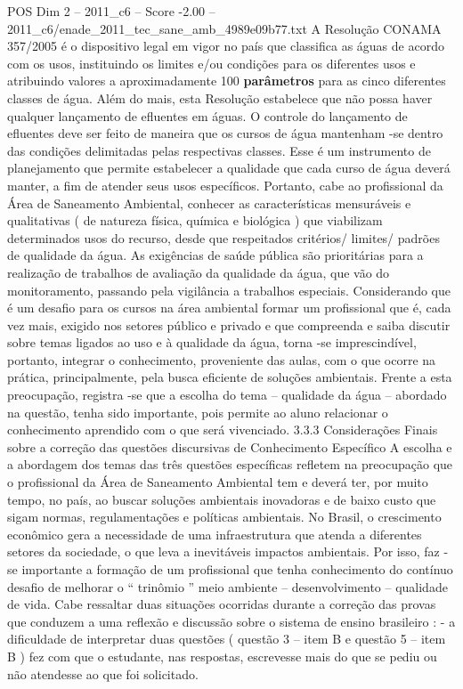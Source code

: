 \begin{textsample}{POS Dim 2 – 2011\_c6 – Score -2.00 – 2011\_c6/enade\_2011\_tec\_sane\_amb\_4989e09b77.txt}
A Resolução CONAMA 357/2005 é o dispositivo legal em vigor no país que classifica as águas de acordo com os usos, instituindo os limites e/ou condições para os diferentes usos e atribuindo valores a aproximadamente 100 \textbf{parâmetros} para as cinco diferentes classes de água.
Além do mais, esta Resolução estabelece que não possa haver qualquer lançamento de efluentes em águas.
O controle do lançamento de efluentes deve ser feito de maneira que os cursos de água mantenham -se dentro das condições delimitadas pelas respectivas classes.
Esse é um instrumento de planejamento que permite estabelecer a qualidade que cada curso de água deverá manter, a fim de atender seus usos específicos.
Portanto, cabe ao profissional da Área de Saneamento Ambiental, conhecer as características mensuráveis e qualitativas ( de natureza física, química e biológica ) que viabilizam determinados usos do recurso, desde que respeitados critérios/ limites/ padrões de qualidade da água.
As exigências de saúde pública são prioritárias para a realização de trabalhos de avaliação da qualidade da água, que vão do monitoramento, passando pela vigilância a trabalhos especiais.
Considerando que é um desafio para os cursos na área ambiental formar um profissional que é, cada vez mais, exigido nos setores público e privado e que compreenda e saiba discutir sobre temas ligados ao uso e à qualidade da água, torna -se imprescindível, portanto, integrar o conhecimento, proveniente das aulas, com o que ocorre na prática, principalmente, pela busca eficiente de soluções ambientais.
Frente a esta preocupação, registra -se que a escolha do tema – qualidade da água – abordado na questão, tenha sido importante, pois permite ao aluno relacionar o conhecimento aprendido com o que será vivenciado. 3.3.3 Considerações Finais sobre a correção das questões discursivas de Conhecimento Específico A escolha e a abordagem dos temas das três questões específicas refletem na preocupação que o profissional da Área de Saneamento Ambiental tem e deverá ter, por muito tempo, no país, ao buscar soluções ambientais inovadoras e de baixo custo que sigam normas, regulamentações e políticas ambientais.
No Brasil, o crescimento econômico gera a necessidade de uma infraestrutura que atenda a diferentes setores da sociedade, o que leva a inevitáveis impactos ambientais.
Por isso, faz -se importante a formação de um profissional que tenha conhecimento do contínuo desafio de melhorar o “ trinômio ” meio ambiente – desenvolvimento – qualidade de vida.
Cabe ressaltar duas situações ocorridas durante a correção das provas que conduzem a uma reflexão e discussão sobre o sistema de ensino brasileiro : - a dificuldade de interpretar duas questões ( questão 3 – item B e questão 5 – item B ) fez com que o estudante, nas respostas, escrevesse mais do que se pediu ou não atendesse ao que foi solicitado.

\end{textsample}
